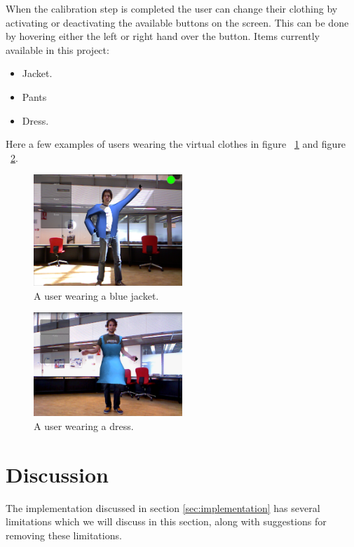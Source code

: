 \documentclass[twocolumn,a4paper]{article}
\begin{document}
When the calibration step is completed the user can change their clothing by activating or deactivating the available buttons on the screen. This can be done by hovering either the left or right hand over the button.
Items currently available in this project:
\begin{itemize}
\item Jacket.
\item Pants 
\item Dress.
\end{itemize}
Here a few examples of users wearing the virtual clothes in figure ~\ref{fig:jacket_morris} and figure ~\ref{fig:dress_fedde}.
\begin{figure}[h!]
\centering
\includegraphics[width=0.5\textwidth]{GUI_jacket_morris.png} 
\caption{A user wearing a blue jacket.}
\label{fig:jacket_morris}
\end{figure}

\begin{figure}[h!]
\centering
\includegraphics[width=0.5\textwidth]{dress_fedde.png} 
\caption{A user wearing a dress.}
\label{fig:dress_fedde}
\end{figure}

\section{Discussion}
\label{sec:discussion}

The implementation discussed in section \ref{sec:implementation} has several limitations which we will discuss in this section, along with suggestions for removing these limitations. 
\end{document}

